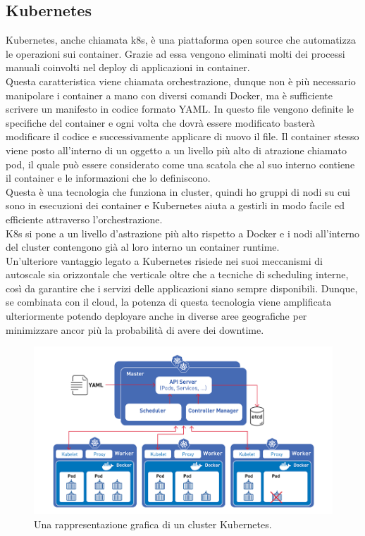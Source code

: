 \documentclass[a4paper,12pt]{report}
\begin{document}
\subsection{Kubernetes}
Kubernetes, anche chiamata k8s, è una piattaforma open source che automatizza le operazioni sui container. Grazie ad essa vengono eliminati molti dei processi manuali coinvolti nel deploy di applicazioni in container. \\
Questa caratteristica viene chiamata orchestrazione, dunque non è più necessario manipolare i container a mano con diversi comandi Docker, ma è sufficiente scrivere un manifesto in codice formato YAML. In questo file vengono definite le specifiche del container e ogni volta che dovrà essere modificato basterà modificare il codice e successivamente applicare di nuovo il file. Il container stesso viene posto all'interno di un oggetto a un livello più alto di atrazione chiamato pod, il quale può essere considerato come una scatola che al suo interno contiene il container e le informazioni che lo definiscono.\\
Questa è una tecnologia che funziona in cluster, quindi ho gruppi di nodi su cui sono in esecuzioni dei container e Kubernetes aiuta a gestirli in modo facile ed efficiente attraverso l'orchestrazione.\\
K8s si pone a un livello d'astrazione più alto rispetto a Docker e i nodi all'interno del cluster contengono già al loro interno un container runtime.\cite{kubernetes}\\ 
Un'ulteriore vantaggio legato a Kubernetes risiede nei suoi meccanismi di autoscale sia orizzontale che verticale oltre che a tecniche di scheduling interne, così da garantire che i servizi delle applicazioni siano sempre disponibili. Dunque, se combinata con il cloud, la potenza di questa tecnologia viene amplificata ulteriormente potendo deployare anche in diverse aree geografiche per minimizzare ancor più la probabilità di avere dei downtime.\\


\begin{figure}[h]
	\includegraphics[width=1.0\textwidth]{k8s}
    \caption{Una rappresentazione grafica di un cluster Kubernetes. \cite{k8simg}}
    \label{fig:k8s}
\end{figure}
\end{document}
